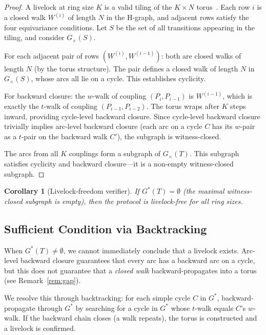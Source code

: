 \documentclass[11pt]{article}
\newtheorem{corollary}[theorem]{Corollary}
\begin{document}
\begin{proof}
A livelock at ring size $K$ is a valid tiling of the $K \times N$ torus~\cite{klinkhamer-ebnenasir}. Each row $i$ is a closed walk $W^{(i)}$ of length $N$ in the H-graph, and adjacent rows satisfy the four equivariance conditions. Let $S$ be the set of all transitions appearing in the tiling, and consider $G_\times(S)$.

For each adjacent pair of rows $(W^{(i)}, W^{(i-1)})$: both are closed walks of length $N$ (by the torus structure). The pair defines a closed walk of length $N$ in $G_\times(S)$, whose arcs all lie on a cycle. This establishes cyclicity.

For backward closure: the $w$-walk of coupling $(P_i, P_{i-1})$ is $W^{(i-1)}$, which is exactly the $t$-walk of coupling $(P_{i-1}, P_{i-2})$. The torus wraps after $K$ steps inward, providing cycle-level backward closure. Since cycle-level backward closure trivially implies arc-level backward closure (each arc on a cycle $C$ has its $w$-pair as a $t$-pair on the backward walk $C'$), the subgraph is witness-closed.

The arcs from all $K$ couplings form a subgraph of $G_\times(T)$. This subgraph satisfies cyclicity and backward closure---it is a non-empty witness-closed subgraph.
\end{proof}

\begin{corollary}[Livelock-freedom verifier]
\label{cor:freedom}
If $G^*(T) = \emptyset$ (the maximal witness-closed subgraph is empty), then the protocol is livelock-free for all ring sizes.
\end{corollary}

\subsection{Sufficient Condition via Backtracking}

When $G^*(T) \neq \emptyset$, we cannot immediately conclude that a livelock exists. Arc-level backward closure guarantees that every arc has a backward arc on a cycle, but this does not guarantee that a \emph{closed walk} backward-propagates into a torus (see Remark~\ref{rem:gap}).

We resolve this through backtracking: for each simple cycle $C$ in $G^*$, backward-propagate through $G^*$ by searching for a cycle in $G^*$ whose $t$-walk equals $C$'s $w$-walk. If the backward chain closes (a walk repeats), the torus is constructed and a livelock is confirmed.
\end{document}

